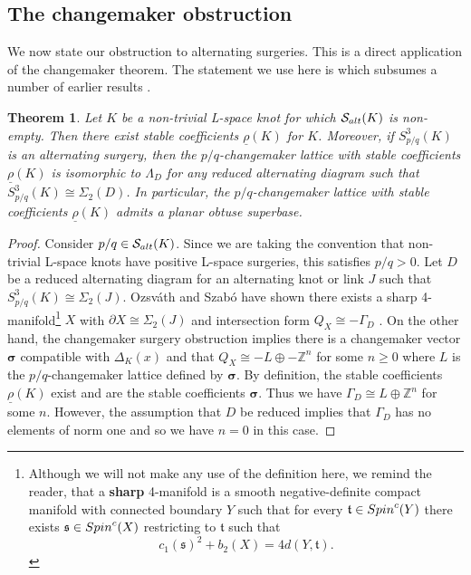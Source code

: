 \documentclass{amsart} %
\newcommand{\Z}{\mathbb{Z}}
\newcommand{\Salt}{\mathcal{S}_{\rm alt}}
\newcommand{\spinc}{\ifmmode{{\rm Spin}^c}\else{${\rm spin}^c$}\fi}
\newcommand{\spinct}{\mathfrak t}
\newcommand{\spincs}{\mathfrak s}
\newcommand{\bsigma}{\bm{\sigma}}
\theoremstyle{thm}
\newtheorem{thm}[Theorem]{Theorem}
\theoremstyle{definition}
\numberwithin{equation}{section}
\begin{document}
\subsection{The changemaker obstruction}
We now state our obstruction to alternating surgeries. This is a direct application of the changemaker theorem. The statement we use here is \cite[Theorem~2.7]{Mc17} which subsumes a number of earlier results \cite{GreeneLRP, Gr13, Gi15, Mc15}.
\begin{thm}\label{thm:alt_surgery_obstructions}
    Let $K$ be a non-trivial L-space knot for which $\Salt(K)$ is non-empty. Then there exist stable coefficients $\underline{\rho}(K)$ for $K$. Moreover, if $S_{p/q}^3(K)$ is an alternating surgery, then the $p/q$-changemaker lattice with stable coefficients $\underline{\rho}(K)$ is isomorphic to $\Lambda_D$ for any reduced alternating diagram such that $S_{p/q}^3(K)\cong \Sigma_2(D)$. In particular, the $p/q$-changemaker lattice with stable coefficients $\underline{\rho}(K)$ admits a planar obtuse superbase.
\end{thm}
\begin{proof}
    Consider $p/q\in \Salt(K)$. Since we are taking the convention that non-trivial L-space knots have positive L-space surgeries, this satisfies $p/q>0$. Let $D$ be a reduced alternating diagram for an alternating knot or link $J$ such that $S_{p/q}^3(K)\cong \Sigma_2(J)$. Ozsv\'ath and Szab\'o have shown there exists a sharp 4-manifold\footnote{Although we will not make any use of the definition here, we remind the reader, that a \textbf{sharp} 4-manifold is a smooth negative-definite compact manifold with connected boundary $Y$ such that for every $\spinct \in \spinc(Y)$ there exists $\spincs \in \spinc(X)$ restricting to $\spinct$ such that \[c_1(\spincs)^2+b_2(X)= 4d(Y,\spinct).\]} $X$ with $\partial X \cong \Sigma_2(J)$ and intersection form $Q_X\cong -\Gamma_D$ \cite[Theorem~3.4]{OS05}. On the other hand, the changemaker surgery obstruction \cite[Theorem~2.7]{Mc17} implies there is a changemaker vector $\bsigma$ compatible with $\Delta_K(x)$ and that $Q_X\cong -L\oplus -\Z^n$ for some $n\geq 0$ where $L$ is the $p/q$-changemaker lattice defined by $\bsigma$. By definition, the stable coefficients $\underline{\rho}(K)$ exist and are the stable coefficients $\bsigma$. Thus we have $\Gamma_D\cong L\oplus \Z^n$ for some $n$. However, the assumption that $D$ be reduced implies that $\Gamma_D$ has no elements of norm one and so we have $n=0$ in this case.
\end{proof}
\end{document}
